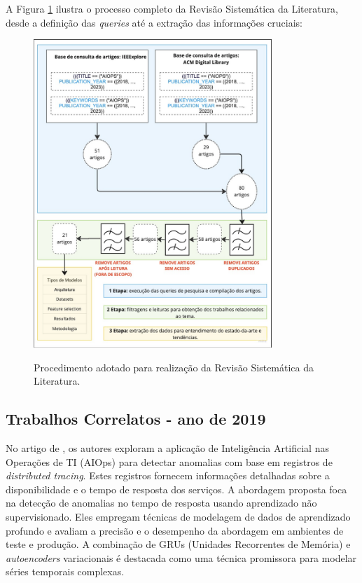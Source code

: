 A Figura \ref{fig:diagrama_detalhado_rev_sistematica} ilustra o processo completo da Revisão Sistemática da Literatura, desde a definição das \textit{queries} até a extração das informações cruciais:


\begin{figure}[H]
\centering
\caption{Procedimento adotado para realização da Revisão Sistemática da Literatura.} \includegraphics[width=9cm,height=\textwidth,keepaspectratio]{2-images/Fluxograma-papers.png}
\newline {}\label{fig:diagrama_detalhado_rev_sistematica}
\end{figure}    
    

\subsection{Trabalhos Correlatos - ano de 2019}\label{trab_correlatos_19}

No artigo de \cite{8752866}, os autores exploram a aplicação de Inteligência Artificial nas Operações de TI (AIOps) para detectar anomalias com base em registros de \textit{distributed tracing}. Estes registros fornecem informações detalhadas sobre a disponibilidade e o tempo de resposta dos serviços. A abordagem proposta foca na detecção de anomalias no tempo de resposta usando aprendizado não supervisionado. Eles empregam técnicas de modelagem de dados de aprendizado profundo e avaliam a precisão e o desempenho da abordagem em ambientes de teste e produção. A combinação de GRUs (Unidades Recorrentes de Memória) e \textit{autoencoders} variacionais é destacada como uma técnica promissora para modelar séries temporais complexas.

